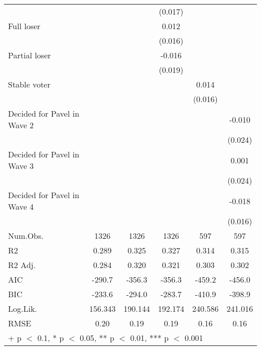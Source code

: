 \begin{table}
\begin{tabular}[t]{lccccc}
 &  &  & (0.017) &  & \\
Full loser &  &  & 0.012 &  & \\
 &  &  & (0.016) &  & \\
Partial loser &  &  & -0.016 &  & \\
 &  &  & (0.019) &  & \\
Stable voter &  &  &  & 0.014 & \\
 &  &  &  & (0.016) & \\
Decided for Pavel in Wave 2 &  &  &  &  & -0.010\\
 &  &  &  &  & \vphantom{1} (0.024)\\
Decided for Pavel in Wave 3 &  &  &  &  & 0.001\\
 &  &  &  &  & (0.024)\\
Decided for Pavel in Wave 4 &  &  &  &  & -0.018\\
 &  &  &  &  & (0.016)\\
\midrule
Num.Obs. & 1326 & 1326 & 1326 & 597 & 597\\
R2 & 0.289 & 0.325 & 0.327 & 0.314 & 0.315\\
R2 Adj. & 0.284 & 0.320 & 0.321 & 0.303 & 0.302\\
AIC & -290.7 & -356.3 & -356.3 & -459.2 & -456.0\\
BIC & -233.6 & -294.0 & -283.7 & -410.9 & -398.9\\
Log.Lik. & 156.343 & 190.144 & 192.174 & 240.586 & 241.016\\
RMSE & 0.20 & 0.19 & 0.19 & 0.16 & 0.16\\
\bottomrule
\multicolumn{6}{l}{\rule{0pt}{1em}+ p $<$ 0.1, * p $<$ 0.05, ** p $<$ 0.01, *** p $<$ 0.001}\\
\end{tabular}
\end{table}
